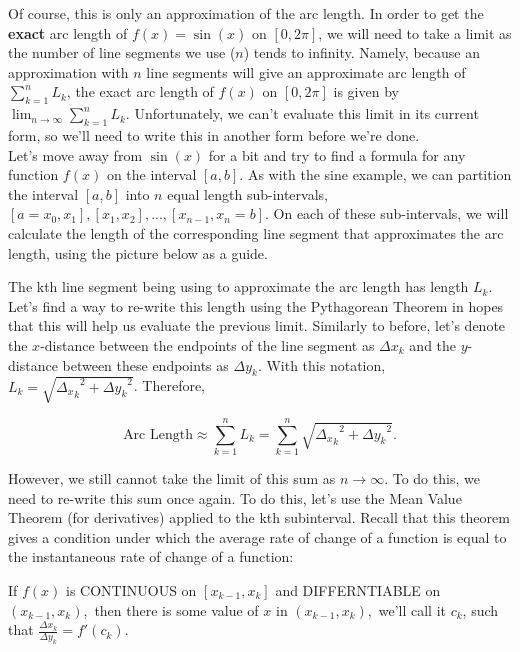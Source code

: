 \documentclass[handout,nooutcomes]{ximera}
\begin{document}
Of course, this is only an approximation of the arc length.  In order to get the \textbf{exact} arc length of $f(x) = \sin(x)$ on $[0, 2\pi]$, we will need to take a limit as the number of line segments we use ($n$) tends to infinity.  Namely, because an approximation with $n$ line segments will give an approximate arc length of $\displaystyle\sum_{k=1}^n L_k$, the exact arc length of $f(x)$ on $[0, 2\pi]$ is given by $\displaystyle\lim_{n \to \infty} \displaystyle\sum_{k=1}^n L_k$.  Unfortunately, we can't evaluate this limit in its current form, so we'll need to write this in another form before we're done.  \\

Let's move away from $\sin(x)$ for a bit and try to find a formula for any function $f(x)$ on the interval $[a,b]$.  As with the sine example, we can partition the interval $[a,b]$ into $n$ equal length sub-intervals, $[a=x_0, x_1], [x_1, x_2], ..., [x_{n-1}, x_n = b]$.  On each of these sub-intervals, we will calculate the length of the corresponding line segment that approximates the arc length, using the picture below as a guide. 


The kth line segment being using to approximate the arc length has length $L_k$.  Let's find a way to re-write this length using the Pythagorean Theorem in hopes that this will help us evaluate the previous limit.  Similarly to before, let's denote the $x$-distance between the endpoints of the line segment as ${\Delta x}_k$ and the $y$-distance between these endpoints as ${\Delta y}_k$.  With this notation, $L_k = \sqrt{{{\Delta_x}_k}^2+{{\Delta y}_k}^2}$.  Therefore, 

$$\text{Arc Length} \approx \displaystyle\sum_{k=1}^n L_k = \displaystyle\sum_{k=1}^n \sqrt{{{\Delta_x}_k}^2+{{\Delta y}_k}^2}.$$

However, we still cannot take the limit of this sum as $n \to \infty$.  To do this, we need to re-write this sum once again.  To do this, let's use the Mean Value Theorem (for derivatives) applied to the kth subinterval.  Recall that this theorem gives a condition under which the average rate of change of a function is equal to the instantaneous rate of change of a function: 

If $f(x)$ is CONTINUOUS on $[x_{k-1},x_k]$ and DIFFERNTIABLE on $(x_{k-1},x_k),$ then there is some value of $x$ in $(x_{k-1},x_k),$ we'll call it $c_k$, such that $\frac{\Delta x_k}{\Delta y_k} = f'(c_k).$  
\end{document}
